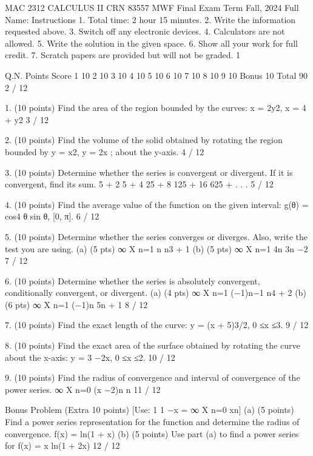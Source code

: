 MAC 2312 CALCULUS II CRN 83557 MWF
Final Exam
Term Fall, 2024
Full Name:
Instructions
1. Total time: 2 hour 15 minutes.
2. Write the information requested above.
3. Switch off any electronic devices.
4. Calculators are not allowed.
5. Write the solution in the given space.
6. Show all your work for full credit.
7. Scratch papers are provided but will not be graded.
1

Q.N.
Points
Score
1
10
2
10
3
10
4
10
5
10
6
10
7
10
8
10
9
10
Bonus
10
Total
90
2 / 12

1. (10 points) Find the area of the region bounded by the curves:
x = 2y2,
x = 4 + y2
3 / 12

2. (10 points) Find the volume of the solid obtained by rotating the region bounded by
y = x2, y = 2x ;
about the y-axis.
4 / 12

3. (10 points) Determine whether the series is convergent or divergent. If it is convergent, find its sum.
5 + 2
5 + 4
25 +
8
125 + 16
625 + . . .
5 / 12

4. (10 points) Find the average value of the function on the given interval:
g(θ) = cos4 θ sin θ,
[0, π].
6 / 12

5. (10 points) Determine whether the series converges or diverges. Also, write the test you are using.
(a) (5 pts)
∞
X
n=1
n
n3 + 1
(b) (5 pts)
∞
X
n=1
4n
3n −2
7 / 12

6. (10 points) Determine whether the series is absolutely convergent, conditionally convergent, or
divergent.
(a) (4 pts)
∞
X
n=1
(−1)n−1
n4 + 2
(b) (6 pts)
∞
X
n=1
(−1)n
5n + 1
8 / 12

7. (10 points) Find the exact length of the curve:
y = (x + 5)3/2,
0 ≤x ≤3.
9 / 12

8. (10 points) Find the exact area of the surface obtained by rotating the curve about the x-axis:
y = 3 −2x,
0 ≤x ≤2.
10 / 12

9. (10 points) Find the radius of convergence and interval of convergence of the power series.
∞
X
n=0
(x −2)n
n
11 / 12

Bonus Problem (Extra 10 points)
[Use:
1
1 −x =
∞
X
n=0
xn]
(a) (5 points) Find a power series representation for the function and determine the radius of convergence.
f(x) = ln(1 + x)
(b) (5 points) Use part (a) to find a power series for
f(x) = x ln(1 + 2x)
12 / 12

